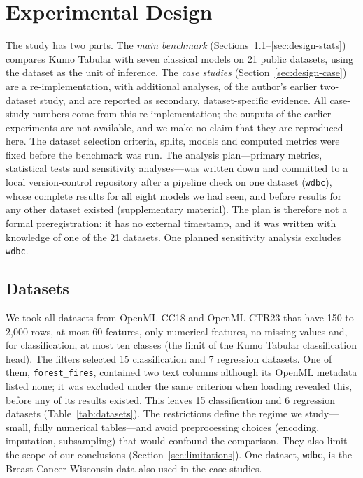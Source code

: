\section{Experimental Design}
\label{sec:design}

The study has two parts. The \emph{main benchmark} (Sections~\ref{sec:design-suite}--\ref{sec:design-stats}) compares
Kumo Tabular with seven classical models on 21 public datasets, using the dataset as the unit of inference. The
\emph{case studies} (Section~\ref{sec:design-case}) are a re-implementation, with additional analyses, of the
author's earlier two-dataset study, and are reported as secondary, dataset-specific evidence. All case-study numbers
come from this re-implementation; the outputs of the earlier experiments are not available, and we make no claim that
they are reproduced here. The dataset selection criteria, splits, models and computed metrics
were fixed before the benchmark was run. The analysis plan---primary metrics, statistical tests and sensitivity
analyses---was written down and committed to a local version-control repository after a pipeline check on one dataset
(\texttt{wdbc}), whose complete results for all eight models we had seen, and before results for any other dataset
existed (supplementary material). The plan is therefore not a formal preregistration: it has no external timestamp,
and it was written with knowledge of one of the 21 datasets. One planned sensitivity analysis excludes \texttt{wdbc}.

\subsection{Datasets}
\label{sec:design-suite}
We took all datasets from OpenML-CC18 \citep{bischl2021openml} and OpenML-CTR23 \citep{fischer2023ctr23} that have
150 to 2{,}000 rows, at most 60 features, only numerical features, no missing values and, for classification, at most
ten classes (the limit of the Kumo Tabular classification head). The filters selected 15 classification and 7
regression datasets. One of them, \texttt{forest\_fires}, contained two text columns although its OpenML metadata
listed none; it was excluded under the same criterion when loading revealed this, before any of its results existed.
This leaves 15 classification and 6 regression datasets (Table~\ref{tab:datasets}). The restrictions define the regime we study---small, fully numerical tables---and
avoid preprocessing choices (encoding, imputation, subsampling) that would confound the comparison. They also limit the
scope of our conclusions (Section~\ref{sec:limitations}). One dataset, \texttt{wdbc}, is the Breast Cancer Wisconsin
data also used in the case studies.

